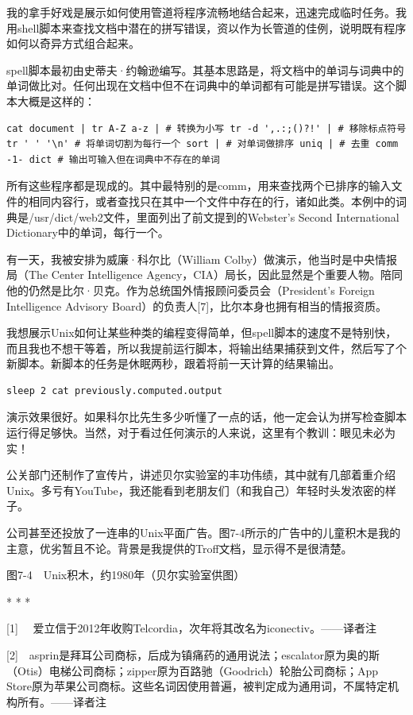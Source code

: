 \documentclass[a4paper,12pt,UTF8,twoside]{ctexbook}
\begin{document}
我的拿手好戏是展示如何使用管道将程序流畅地结合起来，迅速完成临时任务。我用shell脚本来查找文档中潜在的拼写错误，资以作为长管道的佳例，说明既有程序如何以奇异方式组合起来。

spell脚本最初由史蒂夫·约翰逊编写。其基本思路是，将文档中的单词与词典中的单词做比对。任何出现在文档中但不在词典中的单词都有可能是拼写错误。这个脚本大概是这样的：
\begin{lstlisting}
cat document | tr A-Z a-z | # 转换为小写 tr -d ',.:;()?!' | # 移除标点符号 tr ' ' '\n' # 将单词切割为每行一个 sort | # 对单词做排序 uniq | # 去重 comm -1- dict # 输出可输入但在词典中不存在的单词
\end{lstlisting}
所有这些程序都是现成的。其中最特别的是comm，用来查找两个已排序的输入文件的相同内容行，或者查找只在其中一个文件中存在的行，诸如此类。本例中的词典是/usr/dict/web2文件，里面列出了前文提到的Webster’s Second International Dictionary中的单词，每行一个。

有一天，我被安排为威廉·科尔比（William Colby）做演示，他当时是中央情报局（The Center Intelligence Agency，CIA）局长，因此显然是个重要人物。陪同他的仍然是比尔·贝克。作为总统国外情报顾问委员会（President’s Foreign Intelligence Advisory Board）的负责人[7]，比尔本身也拥有相当的情报资质。

我想展示Unix如何让某些种类的编程变得简单，但spell脚本的速度不是特别快，而且我也不想干等着，所以我提前运行脚本，将输出结果捕获到文件，然后写了个新脚本。新脚本的任务是休眠两秒，跟着将前一天计算的结果输出。
\begin{lstlisting}
sleep 2 cat previously.computed.output
\end{lstlisting}
演示效果很好。如果科尔比先生多少听懂了一点的话，他一定会认为拼写检查脚本运行得足够快。当然，对于看过任何演示的人来说，这里有个教训：眼见未必为实！

公关部门还制作了宣传片，讲述贝尔实验室的丰功伟绩，其中就有几部着重介绍Unix。多亏有YouTube，我还能看到老朋友们（和我自己）年轻时头发浓密的样子。

公司甚至还投放了一连串的Unix平面广告。图7-4所示的广告中的儿童积木是我的主意，优劣暂且不论。背景是我提供的Troff文档，显示得不是很清楚。



图7-4　Unix积木，约1980年（贝尔实验室供图）



* * *



[1]　 爱立信于2012年收购Telcordia，次年将其改名为iconectiv。——译者注

[2]　asprin是拜耳公司商标，后成为镇痛药的通用说法；escalator原为奥的斯（Otis）电梯公司商标；zipper原为百路驰（Goodrich）轮胎公司商标；App Store原为苹果公司商标。这些名词因使用普遍，被判定成为通用词，不属特定机构所有。——译者注
\end{document}
